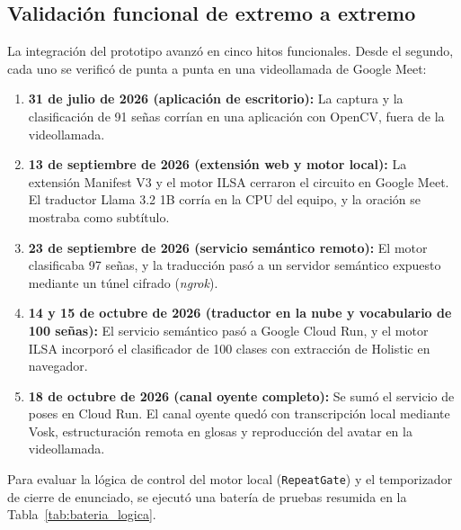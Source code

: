 \subsection{Validación funcional de extremo a extremo}
La integración del prototipo avanzó en cinco hitos funcionales. Desde el segundo, cada uno se verificó de punta a punta en una videollamada de Google Meet:
\begin{enumerate}
    \item \textbf{31 de julio de 2026 (aplicación de escritorio):} La captura y la clasificación de 91 señas corrían en una aplicación con OpenCV, fuera de la videollamada.
    \item \textbf{13 de septiembre de 2026 (extensión web y motor local):} La extensión Manifest V3 y el motor ILSA cerraron el circuito en Google Meet. El traductor Llama 3.2 1B corría en la CPU del equipo, y la oración se mostraba como subtítulo.
    \item \textbf{23 de septiembre de 2026 (servicio semántico remoto):} El motor clasificaba 97 señas, y la traducción pasó a un servidor semántico expuesto mediante un túnel cifrado (\textit{ngrok}).
    \item \textbf{14 y 15 de octubre de 2026 (traductor en la nube y vocabulario de 100 señas):} El servicio semántico pasó a Google Cloud Run, y el motor ILSA incorporó el clasificador de 100 clases con extracción de Holistic en navegador.
    \item \textbf{18 de octubre de 2026 (canal oyente completo):} Se sumó el servicio de poses en Cloud Run. El canal oyente quedó con transcripción local mediante Vosk, estructuración remota en glosas y reproducción del avatar en la videollamada.
\end{enumerate}

Para evaluar la lógica de control del motor local (\texttt{RepeatGate}) y el temporizador de cierre de enunciado, se ejecutó una batería de pruebas resumida en la Tabla~\ref{tab:bateria_logica}.

